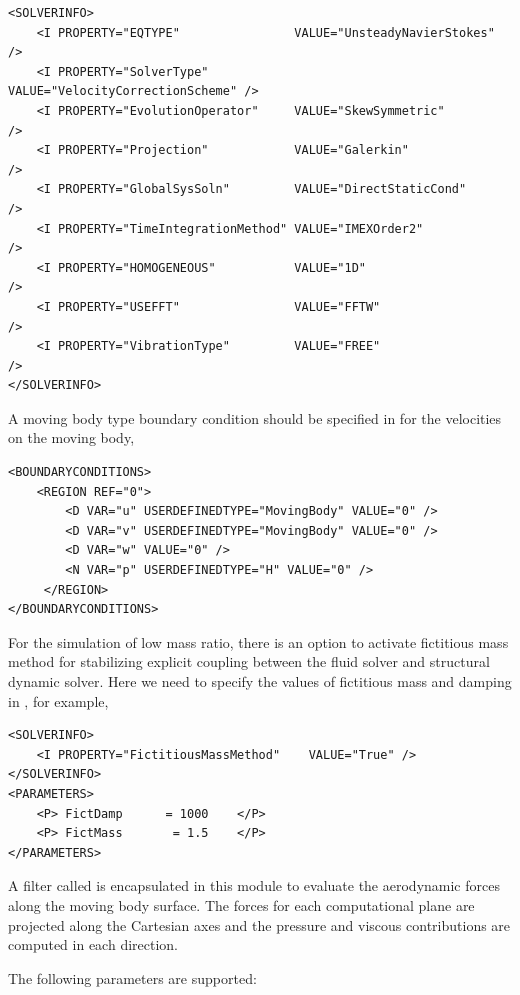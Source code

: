 \begin{lstlisting}[style=XMLStyle]
<SOLVERINFO>
    <I PROPERTY="EQTYPE"                VALUE="UnsteadyNavierStokes"     />
    <I PROPERTY="SolverType"            VALUE="VelocityCorrectionScheme" />
    <I PROPERTY="EvolutionOperator"     VALUE="SkewSymmetric"            />
    <I PROPERTY="Projection"            VALUE="Galerkin"                 />
    <I PROPERTY="GlobalSysSoln"         VALUE="DirectStaticCond"         />
    <I PROPERTY="TimeIntegrationMethod" VALUE="IMEXOrder2"               />
    <I PROPERTY="HOMOGENEOUS"           VALUE="1D"                       />
    <I PROPERTY="USEFFT"                VALUE="FFTW"                     />
    <I PROPERTY="VibrationType"         VALUE="FREE"                     />
</SOLVERINFO>
\end{lstlisting}

A moving body type boundary condition should be specified in  for the velocities on the moving body,

\begin{lstlisting}[style=XMLStyle]
<BOUNDARYCONDITIONS>
    <REGION REF="0">
        <D VAR="u" USERDEFINEDTYPE="MovingBody" VALUE="0" />
        <D VAR="v" USERDEFINEDTYPE="MovingBody" VALUE="0" />
        <D VAR="w" VALUE="0" />
        <N VAR="p" USERDEFINEDTYPE="H" VALUE="0" />
     </REGION>
</BOUNDARYCONDITIONS>
\end{lstlisting}

For the simulation of low mass ratio, there is an option to activate fictitious mass method for stabilizing explicit coupling between the fluid solver and structural dynamic solver. Here we need to specify the values of fictitious mass and damping in , for example,

\begin{lstlisting}[style=XMLStyle]
<SOLVERINFO>
    <I PROPERTY="FictitiousMassMethod"    VALUE="True" />
</SOLVERINFO>
<PARAMETERS>
    <P> FictDamp      = 1000    </P>
    <P> FictMass       = 1.5    </P>
</PARAMETERS>
\end{lstlisting}

A filter called  is encapsulated in this module to evaluate the aerodynamic forces along the moving body surface. The
forces for each computational plane are projected along the Cartesian axes and the pressure and viscous
contributions are computed in each direction.

The following parameters are supported:

